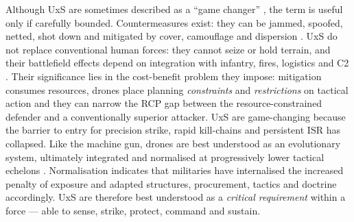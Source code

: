 Although UxS are sometimes described as a ``game changer'' \parencite{dan_participant_1}, the term is useful only if carefully bounded. Countermeasures exist: they can be jammed, spoofed, netted, shot down and mitigated by cover, camouflage and dispersion \parencite{BRONK_2025,darragh_participant_4,stu_lyle_participant_11,bob_tollast_participant_12}.  UxS do not replace conventional human forces: they cannot seize or hold terrain, and their battlefield effects depend on integration with infantry, fires, logistics and C2 \parencite{BRONK_2025,stu_lyle_participant_11,MOLLOY_2024,WATLING_2025B}. Their significance lies in the cost-benefit problem they impose: mitigation consumes resources, drones place planning \textit{constraints} and \textit{restrictions} on tactical action and they can narrow the RCP gap between the resource-constrained defender and a conventionally superior attacker. UxS are game-changing because the barrier to entry for precision strike, rapid kill-chains and persistent ISR has collapsed. Like the machine gun, drones are best understood as an evolutionary system, ultimately integrated and normalised at progressively lower tactical echelons \parencite{stu_lyle_participant_11,oliviero_halton_2026_03_11_menace_misunderstanding,john_2025_1_2}. Normalisation indicates that militaries have internalised the increased penalty of exposure and adapted structures, procurement, tactics and doctrine accordingly. UxS are therefore best understood as a \textit{critical requirement} within a force --- able to sense, strike, protect, command and sustain.


